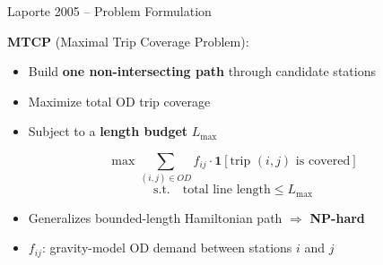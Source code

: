 \documentclass[aspectratio=169, 11pt]{beamer}
\begin{document}
\begin{frame}{Laporte 2005 -- Problem Formulation}

\textbf{MTCP} (Maximal Trip Coverage Problem):

\begin{itemize}
    \item Build \textbf{one non-intersecting path} through candidate stations
    \item Maximize total OD trip coverage
    \item Subject to a \textbf{length budget} \(L_{\max}\)
\end{itemize}

\vspace{0.3cm}
\[
\max \sum_{(i,j) \in OD} f_{ij} \cdot \mathbf{1}[\text{trip } (i,j) \text{ is covered}]
\]
\[
\text{s.t.} \quad \text{total line length} \leq L_{\max}
\]

\begin{itemize}
    \item Generalizes bounded-length Hamiltonian path \(\Rightarrow\) \textbf{NP-hard}
    \item \(f_{ij}\): gravity-model OD demand between stations \(i\) and \(j\)
\end{itemize}
\end{frame}
\end{document}
